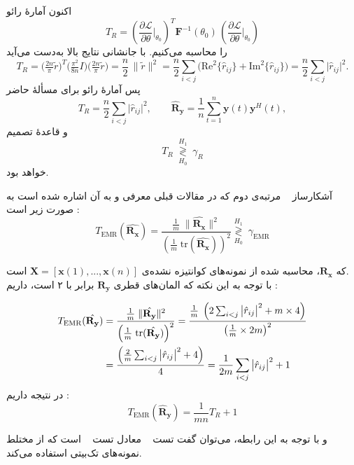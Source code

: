 \begin{اثبات}
	اکنون آمارۀ رائو
	\[
	T_R=\left(\frac{\partial \mathcal{L}}{\partial \theta}\Big|_{\theta_0}\right)^{\!T}
	\mathbf{F}^{-1}(\theta_0)\,
	\left(\frac{\partial \mathcal{L}}{\partial \theta}\Big|_{\theta_0}\right)
	\]
	را محاسبه می‌کنیم. با جانشانی نتایج بالا به‌دست می‌آید
	\[
	T_R=\Big(\tfrac{2n}{\pi}\tilde r\Big)^{\!T}
	\Big(\tfrac{\pi^{2}}{8n}I\Big)
	\Big(\tfrac{2n}{\pi}\tilde r\Big)
	=\frac{n}{2}\,\|\tilde r\|^{2}
	=\frac{n}{2}\sum_{i<j}\Big(\mathrm{Re}^{2}\{\hat r_{ij}\}+\mathrm{Im}^{2}\{\hat r_{ij}\}\Big)
	=\frac{n}{2}\sum_{i<j}\big|\hat r_{ij}\big|^{2}.
	\]
	پس آمارۀ رائو برای مسألهٔ حاضر
	\[
	T_R=\frac{n}{2}\sum_{i<j}\big|\hat r_{ij}\big|^{2},\qquad
	\hat{\mathbf{R}}_{\mathbf{y}}=\frac{1}{n}\sum_{t=1}^{n}\mathbf{y}(t)\mathbf{y}^{H}(t),
	\]
	و قاعدهٔ تصمیم
	\[
	T_R \;\underset{H_0}{\overset{H_1}{\gtrless}}\; \gamma_R
	\]
	خواهد بود.
	
\end{اثبات}


آشکارساز \  مرتبه‌ی دوم که در مقالات قبلی معرفی و به آن اشاره شده است به صورت زیر است :
\begin{equation}
	T_{\mathrm{EMR}}(\hat{\mathbf{R}_\mathbf{x}})=\frac{\frac{1}{m}\; \|\hat{\mathbf{R}_\mathbf{x}}\|^2}{\left(\frac{1}{m}\; \mathrm{tr}(\hat{\mathbf{R}_\mathbf{x}})\right)^2}\underset{H_0}{\overset{H_1}{\gtrless}}\; \gamma_{\mathrm{EMR}} \label{eq:EMR_inf}
\end{equation}

که 
$\mathbf{R}_\mathbf{x}$،
 محاسبه شده از نمونه‌های کوانتیزه نشده‌ی
$\mathbf{X}=[\mathbf{x}(1), ..., \mathbf{x}(n)]$
است.\\
با توجه به این نکته که المان‌های قطری 
$\mathbf{R}_\mathbf{y}$
برابر با ۲ است، داریم :


\begin{align}
	T_{\mathrm{EMR}}(\hat{\mathbf{R}_\mathbf{y}})&=\frac{\frac{1}{m}\; \|\hat{\mathbf{R}_\mathbf{y}}\|^2}{\left(\frac{1}{m}\; \mathrm{tr}(\hat{\mathbf{R}_\mathbf{y}})\right)^2}=\frac{\frac{1}{m}\; \left(2\sum_{i<j}\big|\hat r_{ij}\big|^{2}+m\times4\right)}{\left(\frac{1}{m}\times 2m\right)^2} \notag \\
	&=\frac{\left(\frac{2}{m}\sum_{i<j}\big|\hat r_{ij}\big|^{2}+4\right)}{4}=\frac{1}{2m} \sum_{i<j}\big|\hat r_{ij}\big|^{2} + 1 \label{eq:EMR_onebit}
\end{align}
در نتیجه داریم :
\begin{equation}
	T_{\mathrm{EMR}}(\hat{\mathbf{R}}_{\mathbf{y}})=\frac{1}{mn}T_R + 1
\end{equation}

و با توجه به این رابطه، می‌توان گفت تست \  معادل تست \  است که از  مختلط نمونه‌های تک‌بیتی استفاده می‌کند.
